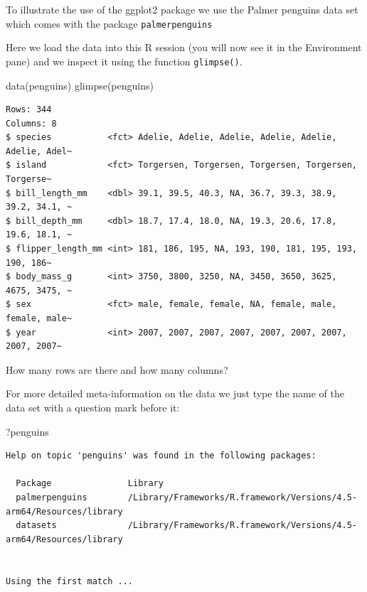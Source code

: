 \documentclass[
  letterpaper,
  DIV=11,
  numbers=noendperiod]{scrreprt}
\newenvironment{Shaded}{\begin{snugshade}}{\end{snugshade}}
\newcommand{\FunctionTok}[1]{\textcolor[rgb]{0.28,0.35,0.67}{#1}}
\newcommand{\NormalTok}[1]{\textcolor[rgb]{0.00,0.23,0.31}{#1}}
\begin{document}
To illustrate the use of the ggplot2 package we use the Palmer penguins
data set which comes with the package \texttt{palmerpenguins}

Here we load the data into this R session (you will now see it in the
Environment pane) and we inspect it using the function
\texttt{glimpse()}.

\begin{Shaded}
\begin{Highlighting}[]
\FunctionTok{data}\NormalTok{(penguins)}
\FunctionTok{glimpse}\NormalTok{(penguins)}
\end{Highlighting}
\end{Shaded}

\begin{verbatim}
Rows: 344
Columns: 8
$ species           <fct> Adelie, Adelie, Adelie, Adelie, Adelie, Adelie, Adel~
$ island            <fct> Torgersen, Torgersen, Torgersen, Torgersen, Torgerse~
$ bill_length_mm    <dbl> 39.1, 39.5, 40.3, NA, 36.7, 39.3, 38.9, 39.2, 34.1, ~
$ bill_depth_mm     <dbl> 18.7, 17.4, 18.0, NA, 19.3, 20.6, 17.8, 19.6, 18.1, ~
$ flipper_length_mm <int> 181, 186, 195, NA, 193, 190, 181, 195, 193, 190, 186~
$ body_mass_g       <int> 3750, 3800, 3250, NA, 3450, 3650, 3625, 4675, 3475, ~
$ sex               <fct> male, female, female, NA, female, male, female, male~
$ year              <int> 2007, 2007, 2007, 2007, 2007, 2007, 2007, 2007, 2007~
\end{verbatim}

How many rows are there and how many columns?

For more detailed meta-information on the data we just type the name of
the data set with a question mark before it:

\begin{Shaded}
\begin{Highlighting}[]
\NormalTok{?penguins}
\end{Highlighting}
\end{Shaded}

\begin{verbatim}
Help on topic 'penguins' was found in the following packages:

  Package               Library
  palmerpenguins        /Library/Frameworks/R.framework/Versions/4.5-arm64/Resources/library
  datasets              /Library/Frameworks/R.framework/Versions/4.5-arm64/Resources/library


Using the first match ...
\end{verbatim}
\end{document}
